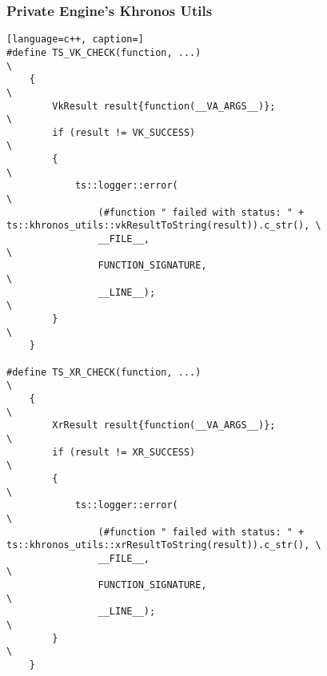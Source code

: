 \newpage

\subsubsection{Private Engine's Khronos Utils}
\label{sec:khronos_utils}
\begin{lstlisting}[language=c++, caption=]
#define TS_VK_CHECK(function, ...)                                                                         \
    {                                                                                                      \
        VkResult result{function(__VA_ARGS__)};                                                            \
        if (result != VK_SUCCESS)                                                                          \
        {                                                                                                  \
            ts::logger::error(                                                                             \
                (#function " failed with status: " + ts::khronos_utils::vkResultToString(result)).c_str(), \
                __FILE__,                                                                                  \
                FUNCTION_SIGNATURE,                                                                        \
                __LINE__);                                                                                 \
        }                                                                                                  \
    }

#define TS_XR_CHECK(function, ...)                                                                         \
    {                                                                                                      \
        XrResult result{function(__VA_ARGS__)};                                                            \
        if (result != XR_SUCCESS)                                                                          \
        {                                                                                                  \
            ts::logger::error(                                                                             \
                (#function " failed with status: " + ts::khronos_utils::xrResultToString(result)).c_str(), \
                __FILE__,                                                                                  \
                FUNCTION_SIGNATURE,                                                                        \
                __LINE__);                                                                                 \
        }                                                                                                  \
    }


\end{lstlisting}
